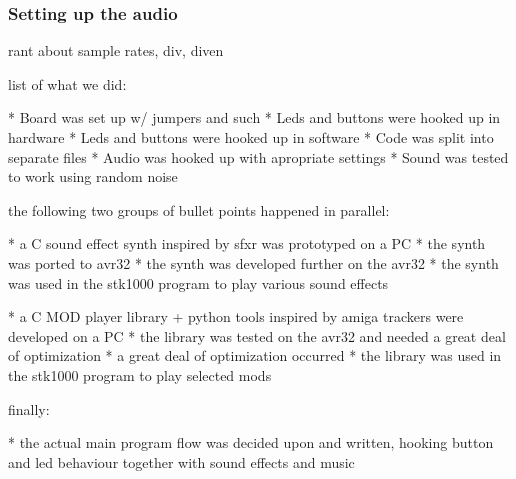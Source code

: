 \subsubsection{Setting up the audio}
rant about sample rates, div, diven


list of what we did:

* Board was set up w/ jumpers and such
* Leds and buttons were hooked up in hardware
* Leds and buttons were hooked up in software
* Code was split into separate files
* Audio was hooked up with apropriate settings
* Sound was tested to work using random noise


the following two groups of bullet points happened in parallel:

* a C sound effect synth inspired by sfxr was prototyped on a PC
* the synth was ported to avr32
* the synth was developed further on the avr32
* the synth was used in the stk1000 program to play various sound effects

* a C MOD player library + python tools inspired by amiga trackers were developed on a PC
* the library was tested on the avr32 and needed a great deal of optimization
* a great deal of optimization occurred 
* the library was used in the stk1000 program to play selected mods


finally:

* the actual main program flow was decided upon and written, hooking button and led behaviour together with sound effects and music